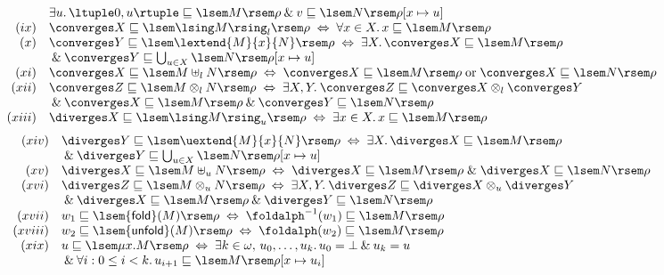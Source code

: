 \begin{lemma}
\[\begin{array}{rl}
& \exists u. \, \ltuple 0, u \rtuple \sqsubseteq \lsem M \rsem \rho 
\: \& \: v \sqsubseteq \lsem N \rsem \rho [x \mapsto u] \\
(ix) & \converges X \sqsubseteq \lsem \lsing M \rsing_{l} \rsem \rho \; \Leftrightarrow \; \forall x \in X. \, x \sqsubseteq \lsem M \rsem \rho \\
(x) & \converges Y \sqsubseteq \lsem \lextend{M}{x}{N} \rsem \rho \; \Leftrightarrow \; \exists X. \, \converges X \sqsubseteq \lsem M \rsem \rho \\
& \: \& \: \converges Y \sqsubseteq \bigcup_{u \in X} \lsem N \rsem \rho [x \mapsto u] \\
(xi) & \converges X \sqsubseteq \lsem M \uplus_{l} N \rsem \rho \; \Leftrightarrow \; \converges X \sqsubseteq \lsem M \rsem \rho \; \mbox{or} \; \converges X \sqsubseteq \lsem N \rsem \rho \\
(xii) & \converges Z \sqsubseteq \lsem M \otimes_{l} N \rsem \rho \; \Leftrightarrow \; \exists X, Y. \: \converges Z \sqsubseteq \converges X \otimes_{l} \converges Y \\
& \: \& \: \converges X \sqsubseteq \lsem M \rsem \rho \: \& \: \converges Y \sqsubseteq \lsem N \rsem \rho  \\
(xiii) & \diverges X \sqsubseteq \lsem \lsing M \rsing_{u} \rsem \rho \; \Leftrightarrow \; \exists x \in X. \, x \sqsubseteq \lsem M \rsem \rho 
\end{array} \]
\[ \begin{array}{rl}
(xiv) & \diverges Y \sqsubseteq \lsem \uextend{M}{x}{N} \rsem \rho \; \Leftrightarrow \; \exists X. \, \diverges X \sqsubseteq \lsem M \rsem \rho \\
& \: \& \: \diverges Y \sqsubseteq \bigcup_{u \in X} \lsem N \rsem \rho [x \mapsto u] \\ 
(xv) & \diverges X \sqsubseteq \lsem M \uplus_{u} N \rsem \rho \; \Leftrightarrow \; \diverges X \sqsubseteq \lsem M \rsem \rho \; \& \; \diverges X \sqsubseteq \lsem N \rsem \rho \\
(xvi) & \diverges Z \sqsubseteq \lsem M \otimes_{u} N \rsem \rho \; \Leftrightarrow \; \exists X, Y . \: \diverges Z \sqsubseteq \diverges X \otimes_{u} \diverges Y \\
& \: \& \: \diverges X \sqsubseteq \lsem M \rsem \rho \: \& \: \diverges Y \sqsubseteq \lsem N \rsem \rho \\
(xvii) & w_{1} \sqsubseteq \lsem {\sf fold}(M) \rsem \rho \; \Leftrightarrow \; {\foldalph}^{-1}(w_{1}) \sqsubseteq \lsem M \rsem \rho \\
(xviii) & w_{2} \sqsubseteq \lsem {\sf unfold}(M) \rsem \rho \; \Leftrightarrow \; {\foldalph}(w_{2}) \sqsubseteq \lsem M \rsem \rho \\
(xix) & u \sqsubseteq \lsem \mu x .  M \rsem \rho \; \Leftrightarrow \; \exists k \in \omega , \, u_{0}, \ldots , u_{k}. \, u_{0} = \bot \: \& \: u_{k} = u \\
& \: \& \: \forall i: 0 \leq i < k. \, u_{i+1} \sqsubseteq \lsem M \rsem \rho [x \mapsto u_{i}] 
\end{array} \]
\end{lemma}

